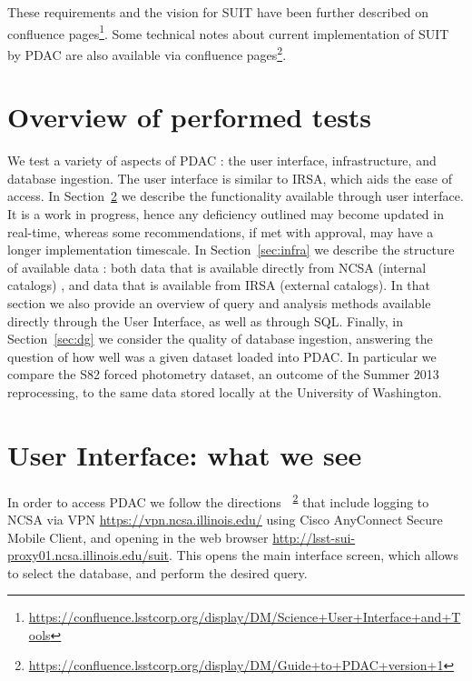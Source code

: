 \documentclass[fleqn,usenatbib]{mnras} %
\begin{document}
These requirements and the vision for SUIT have been further described on confluence pages\footnote{\url{https://confluence.lsstcorp.org/display/DM/Science+User+Interface+and+Tools}}. Some technical notes about current implementation of SUIT by PDAC are also available via confluence pages\footnote{\url{https://confluence.lsstcorp.org/display/DM/Guide+to+PDAC+version+1}\label{note1}}. 


\section{Overview of performed tests}

We test a variety of aspects of PDAC : the user interface, infrastructure, and database ingestion.  The user interface is similar to IRSA, which aids the ease of access. In Section~\ref{sec:ui} we describe the functionality available through user interface. It is a work in progress, hence any deficiency outlined may become updated in real-time, whereas some recommendations, if met with approval, may have a longer implementation timescale. In Section~\ref{sec:infra} we describe the structure of  available data : both data that is available directly from NCSA (internal catalogs) , and data that is available from IRSA (external catalogs).  In that section we also provide an overview of query and analysis methods available directly through the User Interface,  as well as through SQL.  Finally, in Section~\ref{sec:dg} we consider the quality of database ingestion, answering the question of how well was a given dataset loaded into PDAC. In particular we compare the S82 forced photometry dataset, an outcome of the Summer 2013 reprocessing, to the same data stored locally at the University of Washington. 


\section{User Interface: what we see}
\label{sec:ui}

In order to access PDAC we 	follow the directions~\textsuperscript{~\ref{note1}} that include logging to NCSA via VPN \url{https://vpn.ncsa.illinois.edu/} using Cisco AnyConnect Secure Mobile Client, and opening in the web browser \url{http://lsst-sui-proxy01.ncsa.illinois.edu/suit}. This opens the main interface screen, which allows to select the database, and perform the desired query. 
\end{document}
